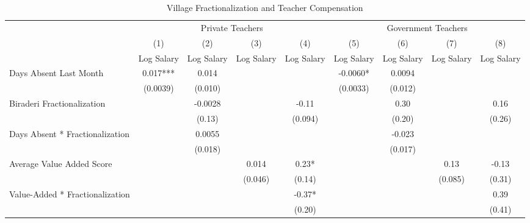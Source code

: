 \begin{table}[htbp]\centering
\def\sym#1{\ifmmode^{#1}\else\(^{#1}\)\fi}
\caption{Village Fractionalization and Teacher Compensation\label{teachercompensation}}
\begin{tabular}{l*{8}{c}}
\toprule
                &\multicolumn{4}{c}{Private Teachers}               &\multicolumn{4}{c}{Government Teachers}            \\\cmidrule(lr){2-5}\cmidrule(lr){6-9}
                &\multicolumn{1}{c}{(1)}&\multicolumn{1}{c}{(2)}&\multicolumn{1}{c}{(3)}&\multicolumn{1}{c}{(4)}&\multicolumn{1}{c}{(5)}&\multicolumn{1}{c}{(6)}&\multicolumn{1}{c}{(7)}&\multicolumn{1}{c}{(8)}\\
                &\multicolumn{1}{c}{Log Salary}&\multicolumn{1}{c}{Log Salary}&\multicolumn{1}{c}{Log Salary}&\multicolumn{1}{c}{Log Salary}&\multicolumn{1}{c}{Log Salary}&\multicolumn{1}{c}{Log Salary}&\multicolumn{1}{c}{Log Salary}&\multicolumn{1}{c}{Log Salary}\\
\midrule
Days Absent Last Month&    0.017***&    0.014   &            &            &  -0.0060*  &   0.0094   &            &            \\
                & (0.0039)   &  (0.010)   &            &            & (0.0033)   &  (0.012)   &            &            \\
Biraderi Fractionalization&            &  -0.0028   &            &    -0.11   &            &     0.30   &            &     0.16   \\
                &            &   (0.13)   &            &  (0.094)   &            &   (0.20)   &            &   (0.26)   \\
Days Absent * Fractionalization&            &   0.0055   &            &            &            &   -0.023   &            &            \\
                &            &  (0.018)   &            &            &            &  (0.017)   &            &            \\
Average Value Added Score&            &            &    0.014   &     0.23*  &            &            &     0.13   &    -0.13   \\
                &            &            &  (0.046)   &   (0.14)   &            &            &  (0.085)   &   (0.31)   \\
Value-Added * Fractionalization&            &            &            &    -0.37*  &            &            &            &     0.39   \\
                &            &            &            &   (0.20)   &            &            &            &   (0.41)   \\

\end{tabular}
\end{table}
